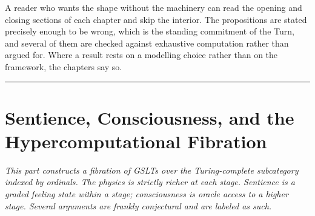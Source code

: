\documentclass[12pt,openright,twoside]{book}
\theoremstyle{remark}
\theoremstyle{plain}
\theoremstyle{remark}
\theoremstyle{plain}
\theoremstyle{plain}
\begin{document}
A reader who wants the shape without the machinery can read the opening and
closing sections of each chapter and skip the interior.
The propositions are stated precisely enough to be wrong, which is the
standing commitment of the Turn, and several of them are checked against
exhaustive computation rather than argued for.
Where a result rests on a modelling choice rather than on the framework, the
chapters say so.

\bigskip
\noindent\hrule
\bigskip


\part{Sentience, Consciousness, and the Hypercomputational Fibration}

\vspace{1em}
\begin{mdframed}[backgroundcolor=remarkgray, linecolor=gray!60,
                 linewidth=1pt, topline=false, rightline=false,
                 bottomline=false]
\small\itshape
This part constructs a fibration of GSLTs over the Turing-complete
subcategory indexed by ordinals.
The physics is strictly richer at each stage.
Sentience is a graded feeling state within a stage;
consciousness is oracle access to a higher stage.
Several arguments are frankly conjectural and are labeled as such.
\end{mdframed}

\bigskip

\end{document}
